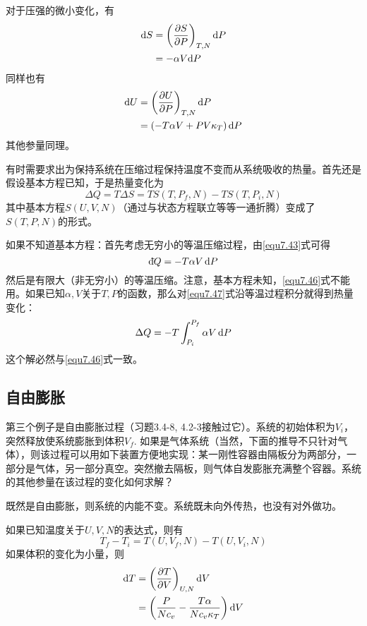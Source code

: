 对于压强的微小变化，有
\begin{align}
	\mathrm{d} S &= \left( \frac{\partial S}{\partial P} \right)_{T, N} \mathrm{d} P \label{equ7.42} \\
	&= -\alpha V \mathrm{d} P \label{equ7.43}
\end{align}
同样也有
\begin{align}
	\mathrm{d} U &= \left( \frac{\partial U}{\partial P} \right)_{T, N} \mathrm{d} P \label{equ7.44} \\
	&= ( -T \alpha V + PV \kappa_T) \,\mathrm{d} P \label{equ7.45}
\end{align}
其他参量同理。

有时需要求出为保持系统在压缩过程保持温度不变而从系统吸收的热量。首先还是假设基本方程已知，于是热量变化为
\begin{equation}
	\Delta Q = T\Delta S = TS(T, P_f, N) - TS(T, P_i, N)
\label{equ7.46}
\end{equation}
其中基本方程$S(U, V, N)$（通过与状态方程联立等等一通折腾）变成了$S(T, P, N)$的形式。 

如果不知道基本方程：首先考虑无穷小的等温压缩过程，由\eqref{equ7.43}式可得
\begin{equation}
	\mathrm d\hspace*{-0.1em}\bar{}\hspace*{0.08em} Q = -T\alpha V \,\mathrm{d} P 
\label{equ7.47}
\end{equation}
然后是有限大（非无穷小）的等温压缩。注意，基本方程未知，\eqref{equ7.46}式不能用。如果已知$\alpha, V$关于$T, P$的函数，那么对\eqref{equ7.47}式沿等温过程积分就得到热量变化：
\begin{equation}
	\Delta Q = -T \int_{P_i}^{P_f} \alpha V \,\mathrm{d} P 
\label{equ7.48}
\end{equation}
这个解必然与\eqref{equ7.46}式一致。

\subsection*{自由膨胀}
第三个例子是自由膨胀过程（习题3.4-8, 4.2-3接触过它）。系统的初始体积为$V_i$，突然释放使系统膨胀到体积$V_f$. 如果是气体系统（当然，下面的推导不只针对气体），则该过程可以用如下装置方便地实现：某一刚性容器由隔板分为两部分，一部分是气体，另一部分真空。突然撤去隔板，则气体自发膨胀充满整个容器。系统的其他参量在该过程的变化如何求解？

既然是自由膨胀，则系统的内能不变。系统既未向外传热，也没有对外做功。

如果已知温度关于$U, V, N$的表达式，则有
\begin{equation}
	T_f - T_i = T(U, V_f, N) - T(U, V_i, N)
\label{equ7.49}
\end{equation}
如果体积的变化为小量，则
\begin{align}
	\mathrm{d} T &= \left( \frac{\partial T}{\partial V} \right)_{U, N} \mathrm{d} V \label{equ7.50} \\
	&= \left( \frac{P}{N c_v} - \frac{T\alpha}{N c_v \kappa_T} \right) \mathrm{d} V \label{equ7.51}
\end{align}

